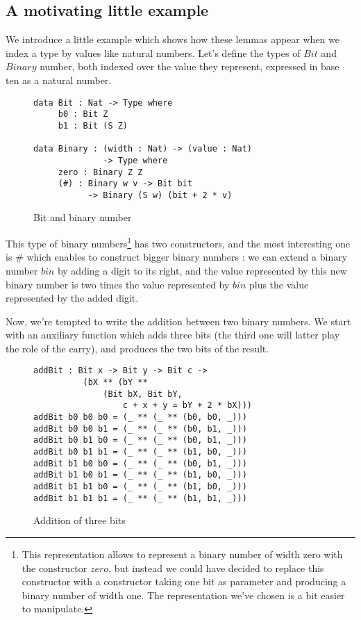 \subsection{A motivating little example}
We introduce a little example which shows how these lemmas appear when we index a type by values like natural numbers.
Let's define the types of $Bit$ and $Binary$ number, both indexed over the value they represent, expressed in base ten as a natural number.
\begin{figure}[H]
\figrule
\begin{center}
\begin{verbatim}
data Bit : Nat -> Type where
     b0 : Bit Z
     b1 : Bit (S Z)
     
data Binary : (width : Nat) -> (value : Nat) 
              -> Type where
     zero : Binary Z Z
     (#) : Binary w v -> Bit bit 
           -> Binary (S w) (bit + 2 * v)
\end{verbatim}
\end{center}
\caption{Bit and binary number}
\figrule
\end{figure}

This type of binary numbers\footnote{This representation allows to represent a binary number of width zero with the constructor $zero$, but instead we could have decided to replace this constructor with a constructor taking one bit as parameter and producing a binary number of width one. The representation we've chosen is a bit easier to manipulate.}  has two constructors, and the most interesting one is $\#$ which enables to construct bigger binary numbers : we can extend a binary number $bin$ by adding a digit to its right, and the value represented by this new binary number is two times the value represented by $bin$ plus the value represented by the added digit.

Now, we're tempted to write the addition between two binary numbers.
We start with an auxiliary function which adds three bits (the third one will latter play the role of the carry), and produces the two bits of the result.

\begin{figure}[H]
\figrule
\begin{center}
\begin{verbatim}
addBit : Bit x -> Bit y -> Bit c ->
          (bX ** (bY ** 
              (Bit bX, Bit bY, 
                  c + x + y = bY + 2 * bX)))
addBit b0 b0 b0 = (_ ** (_ ** (b0, b0, _)))
addBit b0 b0 b1 = (_ ** (_ ** (b0, b1, _)))
addBit b0 b1 b0 = (_ ** (_ ** (b0, b1, _)))
addBit b0 b1 b1 = (_ ** (_ ** (b1, b0, _)))
addBit b1 b0 b0 = (_ ** (_ ** (b0, b1, _)))
addBit b1 b0 b1 = (_ ** (_ ** (b1, b0, _)))
addBit b1 b1 b0 = (_ ** (_ ** (b1, b0, _)))
addBit b1 b1 b1 = (_ ** (_ ** (b1, b1, _)))
\end{verbatim}
\end{center}
\caption{Addition of three bits}
\figrule
\end{figure}

